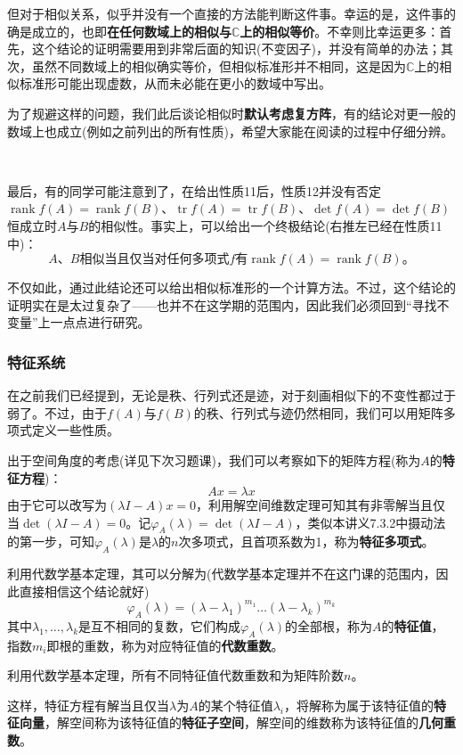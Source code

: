 \documentclass[a4paper,UTF8,fontset=windows]{ctexart}
\DeclareMathOperator{\rank}{rank}
\DeclareMathOperator{\tr}{tr}
\newcommand*{\note}{\noindent *}
\begin{document}
但对于相似关系，似乎并没有一个直接的方法能判断这件事。幸运的是，这件事的确是成立的，也即\textbf{在任何数域上的相似与$\mathbb{C}$上的相似等价}。不幸则比幸运更多：首先，这个结论的证明需要用到非常后面的知识(不变因子)，并没有简单的办法；其次，虽然不同数域上的相似确实等价，但相似标准形并不相同，这是因为$\mathbb{C}$上的相似标准形可能出现虚数，从而未必能在更小的数域中写出。 

为了规避这样的问题，我们此后谈论相似时\textbf{默认考虑复方阵}，有的结论对更一般的数域上也成立(例如之前列出的所有性质)，希望大家能在阅读的过程中仔细分辨。

\

最后，有的同学可能注意到了，在给出性质11后，性质12并没有否定$\rank f(A)=\rank f(B)$、$\tr f(A)=\tr f(B)$、$\det f(A)=\det f(B)$恒成立时$A$与$B$的相似性。事实上，可以给出一个终极结论(右推左已经在性质11中)：
$$\text{$A$、$B$相似当且仅当对任何多项式$f$有$\rank f(A)=\rank f(B)$。}$$

不仅如此，通过此结论还可以给出相似标准形的一个计算方法。不过，这个结论的证明实在是太过复杂了——也并不在这学期的范围内，因此我们必须回到``寻找不变量''上一点点进行研究。

\subsubsection{特征系统}
在之前我们已经提到，无论是秩、行列式还是迹，对于刻画相似下的不变性都过于弱了。不过，由于$f(A)$与$f(B)$的秩、行列式与迹仍然相同，我们可以用矩阵多项式定义一些性质。

出于空间角度的考虑(详见下次习题课)，我们可以考察如下的矩阵方程(称为$A$的\textbf{特征方程})：
$$Ax=\lambda x$$
由于它可以改写为$(\lambda I-A)x=0$，利用解空间维数定理可知其有非零解当且仅当$\det(\lambda I-A)=0$。记$\varphi_A(\lambda)=\det(\lambda I-A)$，类似本讲义7.3.2中摄动法的第一步，可知$\varphi_A(\lambda)$是$\lambda$的$n$次多项式，且首项系数为1，称为\textbf{特征多项式}。

利用代数学基本定理，其可以分解为(代数学基本定理并不在这门课的范围内，因此直接相信这个结论就好)
$$\varphi_A(\lambda)=(\lambda-\lambda_1)^{m_1}\dots(\lambda-\lambda_k)^{m_k}$$
其中$\lambda_1,\dots,\lambda_k$是互不相同的复数，它们构成$\varphi_A(\lambda)$的全部根，称为$A$的\textbf{特征值}，指数$m_i$即根的重数，称为对应特征值的\textbf{代数重数}。

\note 利用代数学基本定理，所有不同特征值代数重数和为矩阵阶数$n$。

这样，特征方程有解当且仅当$\lambda$为$A$的某个特征值$\lambda_i$，将解称为属于该特征值的\textbf{特征向量}，解空间称为该特征值的\textbf{特征子空间}，解空间的维数称为该特征值的\textbf{几何重数}。
\end{document}
